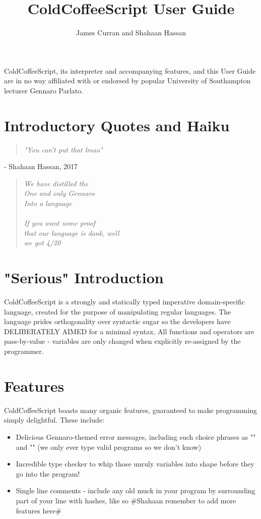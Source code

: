 \documentclass{article}
\author{James Curran and Shahaan Hassan}
\title{ColdCoffeeScript User Guide}
\begin{document}
\maketitle
ColdCoffeeScript, its interpreter and accompanying features, and this User Guide are in no way affiliated with or endorsed by popular University of Southampton lecturer Gennaro Parlato.  
\tableofcontents %

\section{Introductory Quotes and Haiku}
\begin{quote}
\textit{"You can't put that lmao"}
\end{quote}

 - Shahaan Hassan, 2017

\begin{quote}
\textit{We have distilled the\\One and only Gennaro\\Into a language\\\\If you want some proof\\that our language is dank, well\\we got 4/20}
\end{quote}

\section{"Serious" Introduction}
ColdCoffeeScript is a strongly and statically typed imperative domain-specific language, created for the purpose of manipulating regular languages. The language prides orthogonality over syntactic sugar so the developers have DELIBERATELY AIMED for a minimal syntax. All functions and operators are pass-by-value - variables are only changed when explicitly re-assigned by the programmer.

\section{Features}
ColdCoffeeScript boasts many organic features, guaranteed to make programming simply delightful. These include:
\begin{itemize}
\item Delicious Gennaro-themed error messages, including such choice phrases as "" and "" (we only ever type valid programs so we don't know)
\item Incredible type checker to whip those unruly variables into shape before they go into the program!
\item Single line comments - include any old muck in your program by surrounding part of your line with hashes, like so \#Shahaan remember to add more features here\#
\end{itemize}
\end{document}

